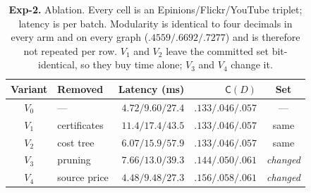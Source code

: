 %
%
%
%

\begin{table}[tb]\centering
\caption{\textbf{Exp-2.} Ablation. Every cell is an Epinions/Flickr/YouTube
triplet; latency is per batch. Modularity is identical to four decimals in every
arm and on every graph ($.4559/.6692/.7277$) and is therefore not repeated per
row. $V_1$ and $V_2$ leave the committed set bit-identical, so they buy time
alone; $V_3$ and $V_4$ change it.}
\label{tab:ablation}
\begin{footnotesize}
\setlength{\tabcolsep}{0.4em}
\begin{tabular*}{\linewidth}{@{\extracolsep{\fill}}clrrc@{}}
\toprule
Variant & Removed & Latency (ms) & $\mathsf C(D)$ & Set \\
\midrule
$V_0$ & --- & $4.72/9.60/27.4$ & $.133/.046/.057$ & --- \\
\midrule
$V_1$ & certificates & $11.4/17.4/43.5$ & $.133/.046/.057$ & same \\
$V_2$ & cost tree    & $6.07/15.9/57.9$ & $.133/.046/.057$ & same \\
$V_3$ & pruning      & $7.66/13.0/39.3$ & $.144/.050/.061$ & \emph{changed} \\
\midrule
$V_4$ & source price & $4.48/9.48/27.3$ & $.156/.058/.061$ & \emph{changed} \\
\bottomrule
\end{tabular*}
\end{footnotesize}
\end{table}


